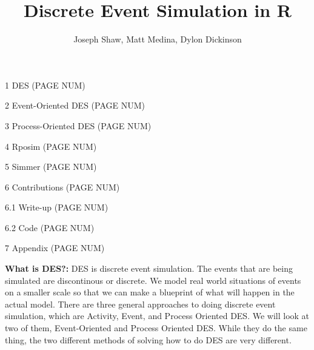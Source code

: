 \documentclass[titlepage]{article}
\author{\Large \newline Joseph Shaw, Matt Medina, Dylon Dickinson}
\title{\Huge Discrete Event Simulation in R}
\begin{document}
	\maketitle
	
\clearpage

\vspace{-1in}


\tableofcontents

\Large

\vfill

1 \hspace{0.1in} DES \hfill (PAGE NUM)

\vfill

2 \hspace{0.1in} Event-Oriented DES \hfill (PAGE NUM)

\vfill

3 \hspace{0.1in} Process-Oriented DES \hfill (PAGE NUM)

\vfill

4 \hspace{0.1in} Rposim \hfill (PAGE NUM)

\vfill

5 \hspace{0.1in} Simmer \hfill (PAGE NUM)

\vfill

6 \hspace{0.1in} Contributions \hfill (PAGE NUM)

\vfill

\hspace{0.25in} 6.1 \hspace{0.1in} Write-up \hfill (PAGE NUM)

\vfill

\hspace{0.25in} 6.2 \hspace{0.1in} Code \hfill (PAGE NUM)

\vfill

7 \hspace{0.1in} Appendix \hfill (PAGE NUM)

\clearpage



\Large \textbf{What is DES?:} \normalsize
DES is discrete event simulation. The events that are being simulated are discontinous or discrete. We model real world situations of events on a smaller scale so that we can make a blueprint of what will happen in the actual model. There are three general approaches to doing discrete event simulation, which are Activity, Event, and Process Oriented DES. We will look at two of them, Event-Oriented and Process Oriented DES. While they do the same thing, the two different methods of solving how to do DES are very different.
\end{document}
